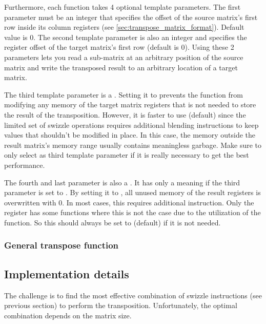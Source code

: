 Furthermore, each function takes 4 optional template parameters.
The first parameter must be an integer that specifies the offset of the source matrix's first row inside its column registers (see \cref{sec:transpose_matrix_format}).
Default value is 0.
The second template parameter is also an integer and specifies the register offset of the target matrix's first row (default is 0).
Using these 2 parameters lets you read a sub-matrix at an arbitrary position of the source matrix and write the transposed result to an arbitrary location of a target matrix.

The third template parameter is a .
Setting it to  prevents the function from modifying any memory of the target matrix registers that is not needed to store the result of the transposition.
However, it is faster to use  (default) since the limited set of swizzle operations requires additional blending instructions to keep values that shouldn't be modified in place.
In this case, the memory outside the result matrix's memory range usually contains meaningless garbage.
Make sure to only select  as third template parameter if it is really necessary to get the best performance.

The fourth and last parameter is also a .
It has only a meaning if the third parameter is set to .
By setting it to , all unused memory of the result registers is overwritten with 0.
In most cases, this requires additional instruction. 
Only the  register has some functions where this is not the case due to the utilization of the  function.
So this should always be set to  (default) if it is not needed.



\subsubsection{General transpose function}


\subsection{Implementation details}
The challenge is to find the most effective combination of swizzle instructions (see previous section) to perform the transposition.
Unfortunately, the optimal combination depends on the matrix size.

